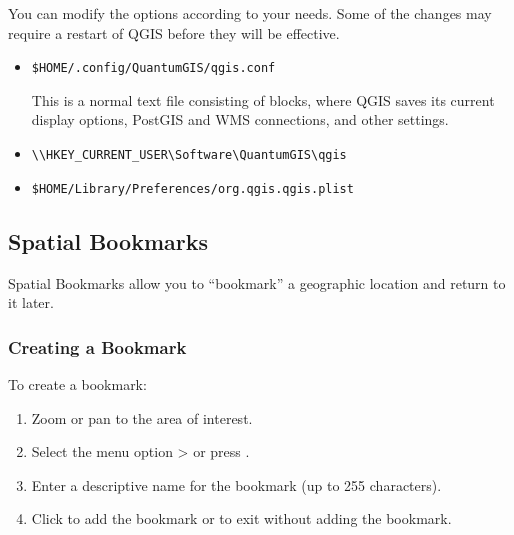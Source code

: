 You can modify the options according to your needs. Some of the changes may 
require a restart of QGIS before they will be effective.

\begin{itemize}
\item {}
\begin{verbatim}
$HOME/.config/QuantumGIS/qgis.conf
\end{verbatim}
This is a normal text file consisting of blocks, where QGIS saves its current
display options, PostGIS and WMS connections, and other settings.

\item {}
\begin{verbatim}
\\HKEY_CURRENT_USER\Software\QuantumGIS\qgis
\end{verbatim}

\item {}
\begin{verbatim}
$HOME/Library/Preferences/org.qgis.qgis.plist
\end{verbatim}
\end{itemize}


\subsection{Spatial Bookmarks}\label{sec:bookmarks}

Spatial Bookmarks allow you to ``bookmark'' a geographic location and return to it later.

\subsubsection{Creating a Bookmark}
To create a bookmark:
\begin{enumerate}
\item Zoom or pan to the area of interest.
\item Select the menu option  >  or press .
\item Enter a descriptive name for the bookmark (up to 255 characters).
\item Click  to add the bookmark or  to exit without adding the bookmark.
\end{enumerate}

